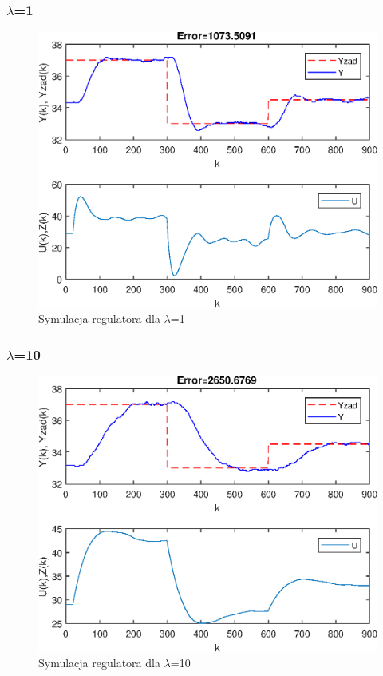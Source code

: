 \subsubsection{$\lambda$=1}

\begin{figure}[h!]
	\centering
	\includegraphics[scale=1]{Rys/N=120Nu=20lambda=1.eps}
	\caption{Symulacja regulatora dla $\lambda$=1}
	\label{lambda2}
\end{figure}
\FloatBarrier
\subsubsection{$\lambda$=10}

\begin{figure}[h!]
	\centering
	\includegraphics[scale=1]{Rys/N=120Nu=20lambda=10.eps}
	\caption{Symulacja regulatora dla $\lambda$=10}
	\label{lambda3}
\end{figure}

